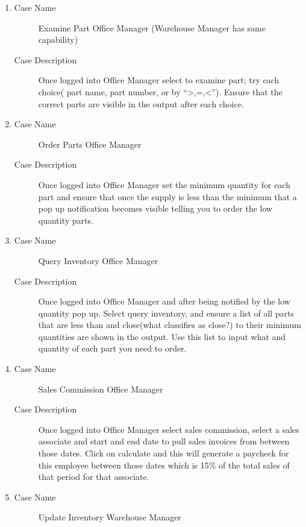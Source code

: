 \documentclass{report}
\begin{document}
\begin{enumerate}
  \item \begin{description}
          \item [Case Name] Examine Part Office Manager (Warehouse Manager has same capability)
          \item [Case Description] Once logged into Office Manager select to examine part; try each choice( part name, part number, or by “>,=,<”). Ensure that the correct parts are visible in the output after each choice.
        \end{description}
  \item \begin{description}
          \item [Case Name] Order Parts Office Manager
          \item [Case Description] Once logged into Office Manager set the minimum quantity for each part and ensure that once the supply is less than the minimum that a pop up notification becomes visible telling you to order the low quantity parts.
        \end{description}
  \item \begin{description}
          \item [Case Name] Query Inventory Office Manager
          \item [Case Description] Once logged into Office Manager and after being notified by the low quantity pop up. Select query inventory, and ensure a list of all parts that are less than and close(what classifies as close?) to their minimum quantities are shown in the output. Use this list to input what and quantity of each part you need to order.
        \end{description}
  \item \begin{description}
          \item [Case Name] Sales Commission Office Manager
          \item [Case Description] Once logged into Office Manager select sales commission, select a sales associate and start and end date to pull sales invoices from between those dates. Click on calculate and this will generate a paycheck for this employee between those dates which is 15\% of the total sales of that period for that associate.
        \end{description}
  \item \begin{description}
          \item [Case Name] Update Inventory Warehouse Manager

\end{description}
\end{enumerate}
\end{document}
